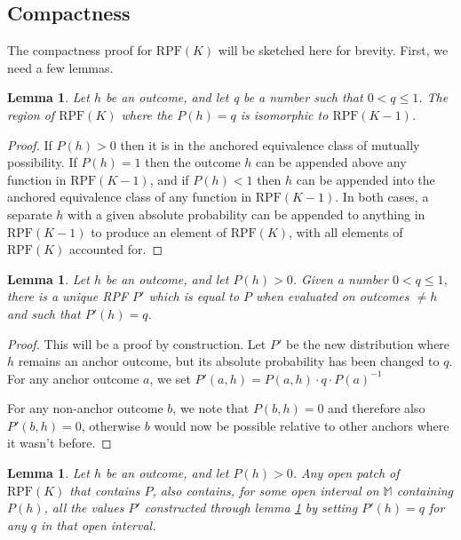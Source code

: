 \documentclass[twoside]{article}
\theoremstyle{plain}%
\newtheorem{lemma}[theorem]{Lemma}
\theoremstyle{definition}
\theoremstyle{remark}
\begin{document}
\subsection{Compactness}

The compactness proof for \(\text{RPF}(K)\) will be sketched here for brevity. First, we need a few lemmas.

\begin{lemma}
\label{lem:withhold_possible_outcome}
Let \(h\) be an outcome, and let q be a number such that \(0 < q \leq 1\). The region of \(\text{RPF}(K)\) where the \(P(h) = q\) is isomorphic to \(\text{RPF}(K-1)\).
\end{lemma}

\begin{proof}
If \(P(h) > 0\) then it is in the anchored equivalence class of mutually possibility. If \(P(h) = 1\) then the outcome \(h\) can be appended above any function in \(\text{RPF}(K - 1)\), and if \(P(h) < 1\) then \(h\) can be appended into the anchored equivalence class of any function in \(\text{RPF}(K-1)\). In both cases, a separate \(h\) with a given absolute probability can be appended to anything in \(\text{RPF}(K-1)\) to produce an element of \(\text{RPF}(K)\), with all elements of \(\text{RPF}(K)\) accounted for.
\end{proof}

\begin{lemma}
\label{lem:change_one_anchor_outcome}
Let \(h\) be an outcome, and let \(P(h) > 0\). Given a number \(0 < q \leq 1\), there is a unique RPF \(P'\) which is equal to \(P\) when evaluated on outcomes \(\neq h\) and such that \(P'(h) = q\).
\end{lemma}

\begin{proof}
This will be a proof by construction. Let \(P'\) be the new distribution where \(h\) remains an anchor outcome, but its absolute probability has been changed to \(q\). For any anchor outcome \(a\), we set \(P'(a, h) = P(a, h) \cdot q \cdot P(a)^{-1} \)

For any non-anchor outcome \(b\), we note that \(P(b, h) = 0\) and therefore also \(P'(b, h) = 0\), otherwise \(b\) would now be possible relative to other anchors where it wasn't before.
\end{proof}

\begin{lemma}
\label{lem:open_anchor_outcome}
Let \(h\) be an outcome, and let \(P(h) > 0\). Any open patch of \(\text{RPF}(K)\) that contains \(P\), also contains, for some open interval on \(\mathbb{M}\) containing \(P(h)\), all the values \(P'\) constructed through lemma \ref{lem:change_one_anchor_outcome} by setting \(P'(h) = q\) for any \(q\) in that open interval.
\end{lemma}
\end{document}
